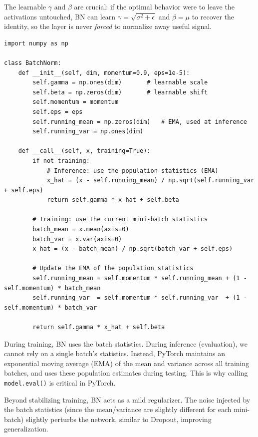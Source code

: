 \documentclass{tufte-handout}
\begin{document}
The learnable $\gamma$ and $\beta$ are crucial: if the optimal behavior were to leave the activations untouched, BN can learn $\gamma = \sqrt{\sigma^2 + \epsilon}$ and $\beta = \mu$ to recover the identity, so the layer is never \emph{forced} to normalize away useful signal.

\begin{lstlisting}[caption={BatchNorm implementation in \texttt{mini\_nn/nn\_utils.py}.}]
import numpy as np

class BatchNorm:
    def __init__(self, dim, momentum=0.9, eps=1e-5):
        self.gamma = np.ones(dim)       # learnable scale
        self.beta = np.zeros(dim)       # learnable shift
        self.momentum = momentum
        self.eps = eps
        self.running_mean = np.zeros(dim)   # EMA, used at inference
        self.running_var = np.ones(dim)

    def __call__(self, x, training=True):
        if not training:
            # Inference: use the population statistics (EMA)
            x_hat = (x - self.running_mean) / np.sqrt(self.running_var + self.eps)
            return self.gamma * x_hat + self.beta

        # Training: use the current mini-batch statistics
        batch_mean = x.mean(axis=0)
        batch_var = x.var(axis=0)
        x_hat = (x - batch_mean) / np.sqrt(batch_var + self.eps)

        # Update the EMA of the population statistics
        self.running_mean = self.momentum * self.running_mean + (1 - self.momentum) * batch_mean
        self.running_var  = self.momentum * self.running_var  + (1 - self.momentum) * batch_var

        return self.gamma * x_hat + self.beta
\end{lstlisting}

\begin{remark}
During training, BN uses the batch statistics. During inference (evaluation), we cannot rely on a single batch's statistics. Instead, PyTorch maintains an exponential moving average (EMA) of the mean and variance across all training batches, and uses these population estimates during testing. This is why calling \texttt{model.eval()} is critical in PyTorch.
\end{remark}

Beyond stabilizing training, BN acts as a mild regularizer. The noise injected by the batch statistics (since the mean/variance are slightly different for each mini-batch) slightly perturbs the network, similar to Dropout, improving generalization.
\end{document}
